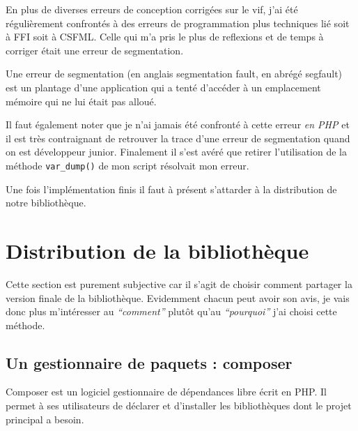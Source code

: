 \documentclass[11pt,a4paper,krantz2,11pt,oneside]{krantz}
\renewenvironment{quote}{\begin{VF}}{\end{VF}}
\begin{document}
En plus de diverses erreurs de conception corrigées sur le vif, j'ai été régulièrement confrontés à des erreurs de programmation plus techniques lié soit à FFI soit à CSFML. Celle qui m'a pris le plus de reflexions et de temps à corriger était une erreur de segmentation.

\begin{quote}
Une erreur de segmentation (en anglais segmentation fault, en abrégé segfault) est un plantage d'une application qui a tenté d'accéder à un emplacement mémoire qui ne lui était pas alloué.

\end{quote}

Il faut également noter que je n'ai jamais été confronté à cette erreur \emph{en PHP} et il est très contraignant de retrouver la trace d'une erreur de segmentation quand on est développeur junior. Finalement il s'est avéré que retirer l'utilisation de la méthode \texttt{var\_dump()} de mon script résolvait mon erreur.

Une fois l'implémentation finis il faut à présent s'attarder à la distribution de notre bibliothèque.

\hypertarget{distribution-de-la-bibliothuxe8que}{%
\section{Distribution de la bibliothèque}\label{distribution-de-la-bibliothuxe8que}}

Cette section est purement subjective car il s'agit de choisir comment partager la version finale de la bibliothèque. Evidemment chacun peut avoir son avis, je vais donc plus m'intéresser au \emph{``comment''} plutôt qu'au \emph{``pourquoi''} j'ai choisi cette méthode.

\hypertarget{un-gestionnaire-de-paquets-composer}{%
\subsection{Un gestionnaire de paquets : composer}\label{un-gestionnaire-de-paquets-composer}}

\begin{quote}
Composer est un logiciel gestionnaire de dépendances libre écrit en PHP. Il permet à ses utilisateurs de déclarer et d'installer les bibliothèques dont le projet principal a besoin.

\end{quote}
\end{document}
